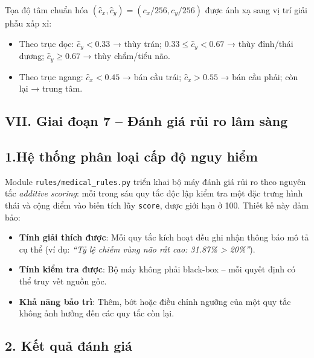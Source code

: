 Tọa độ tâm chuẩn hóa $(\hat{c}_x, \hat{c}_y) = (c_x/256, c_y/256)$ được ánh xạ sang vị trí giải phẫu xấp xỉ:
\begin{itemize}
    \item Theo trục dọc: $\hat{c}_y < 0.33$ → thùy trán; $0.33 \leq \hat{c}_y < 0.67$ → thùy đỉnh/thái dương; $\hat{c}_y \geq 0.67$ → thùy chẩm/tiểu não.
    \item Theo trục ngang: $\hat{c}_x < 0.45$ → bán cầu trái; $\hat{c}_x > 0.55$ → bán cầu phải; còn lại → trung tâm.
\end{itemize}

\subsection*{VII. Giai đoạn 7 -- Đánh giá rủi ro lâm sàng}

\subsection*{1.Hệ thống phân loại cấp độ nguy hiểm}

\begin{sloppypar}
Module \texttt{rules/medical\_rules.py} triển khai bộ máy đánh giá rủi ro theo nguyên tắc \textit{additive scoring}: mỗi trong sáu quy tắc độc lập kiểm tra một đặc trưng hình thái và cộng điểm vào biến tích lũy \texttt{score}, được giới hạn ở 100. Thiết kế này đảm bảo:
\begin{itemize}
    \item \textbf{Tính giải thích được}: Mỗi quy tắc kích hoạt đều ghi nhận thông báo mô tả cụ thể (ví dụ: \textit{``Tỷ lệ chiếm vùng não rất cao: 31.87\% > 20\%''}).
    \item \textbf{Tính kiểm tra được}: Bộ máy không phải black-box -- mỗi quyết định có thể truy vết nguồn gốc.
    \item \textbf{Khả năng bảo trì}: Thêm, bớt hoặc điều chỉnh ngưỡng của một quy tắc không ảnh hưởng đến các quy tắc còn lại.
\end{itemize}
\end{sloppypar}

\subsection*{2. Kết quả đánh giá}


